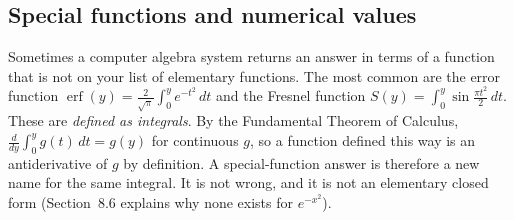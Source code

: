 \documentclass[11pt]{article}
\begin{document}
\subsection*{Special functions and numerical values}

Sometimes a computer algebra system returns an answer in terms of a function that is not on your list of elementary functions. The most common are the error function $\operatorname{erf}(y)=\frac2{\sqrt\pi}\int_0^ye^{-t^2}\,dt$ and the Fresnel function $S(y)=\int_0^y\sin\frac{\pi t^2}2\,dt$. These are \emph{defined as integrals}. By the Fundamental Theorem of Calculus, $\frac d{dy}\int_0^yg(t)\,dt=g(y)$ for continuous $g$, so a function defined this way is an antiderivative of $g$ by definition. A special-function answer is therefore a new name for the same integral. It is not wrong, and it is not an elementary closed form (Section~8.6 explains why none exists for $e^{-x^2}$).
\end{document}
